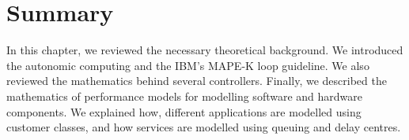 %
%
%
%
%
%
%
%
%
% 
%
%
%
% 
%



  \section{Summary}  
   In this chapter, we reviewed the necessary theoretical background. We introduced the autonomic computing and the IBM's MAPE-K loop guideline.  We also reviewed the mathematics behind several controllers. Finally, we described  the mathematics of performance models for modelling software and hardware  components. We explained how, different applications are modelled using customer classes, and how services are modelled using queuing and delay centres. 
   
   

